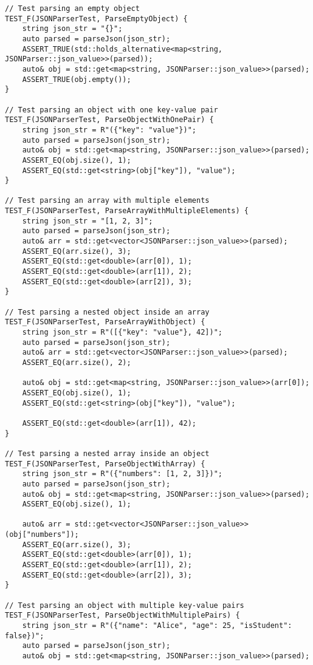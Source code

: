 \begin{verbatim}
// Test parsing an empty object
TEST_F(JSONParserTest, ParseEmptyObject) {
    string json_str = "{}";
    auto parsed = parseJson(json_str);
    ASSERT_TRUE(std::holds_alternative<map<string, JSONParser::json_value>>(parsed));
    auto& obj = std::get<map<string, JSONParser::json_value>>(parsed);
    ASSERT_TRUE(obj.empty());
}

// Test parsing an object with one key-value pair
TEST_F(JSONParserTest, ParseObjectWithOnePair) {
    string json_str = R"({"key": "value"})";
    auto parsed = parseJson(json_str);
    auto& obj = std::get<map<string, JSONParser::json_value>>(parsed);
    ASSERT_EQ(obj.size(), 1);
    ASSERT_EQ(std::get<string>(obj["key"]), "value");
}

// Test parsing an array with multiple elements
TEST_F(JSONParserTest, ParseArrayWithMultipleElements) {
    string json_str = "[1, 2, 3]";
    auto parsed = parseJson(json_str);
    auto& arr = std::get<vector<JSONParser::json_value>>(parsed);
    ASSERT_EQ(arr.size(), 3);
    ASSERT_EQ(std::get<double>(arr[0]), 1);
    ASSERT_EQ(std::get<double>(arr[1]), 2);
    ASSERT_EQ(std::get<double>(arr[2]), 3);
}

// Test parsing a nested object inside an array
TEST_F(JSONParserTest, ParseArrayWithObject) {
    string json_str = R"([{"key": "value"}, 42])";
    auto parsed = parseJson(json_str);
    auto& arr = std::get<vector<JSONParser::json_value>>(parsed);
    ASSERT_EQ(arr.size(), 2);

    auto& obj = std::get<map<string, JSONParser::json_value>>(arr[0]);
    ASSERT_EQ(obj.size(), 1);
    ASSERT_EQ(std::get<string>(obj["key"]), "value");

    ASSERT_EQ(std::get<double>(arr[1]), 42);
}

// Test parsing a nested array inside an object
TEST_F(JSONParserTest, ParseObjectWithArray) {
    string json_str = R"({"numbers": [1, 2, 3]})";
    auto parsed = parseJson(json_str);
    auto& obj = std::get<map<string, JSONParser::json_value>>(parsed);
    ASSERT_EQ(obj.size(), 1);

    auto& arr = std::get<vector<JSONParser::json_value>>(obj["numbers"]);
    ASSERT_EQ(arr.size(), 3);
    ASSERT_EQ(std::get<double>(arr[0]), 1);
    ASSERT_EQ(std::get<double>(arr[1]), 2);
    ASSERT_EQ(std::get<double>(arr[2]), 3);
}

// Test parsing an object with multiple key-value pairs
TEST_F(JSONParserTest, ParseObjectWithMultiplePairs) {
    string json_str = R"({"name": "Alice", "age": 25, "isStudent": false})";
    auto parsed = parseJson(json_str);
    auto& obj = std::get<map<string, JSONParser::json_value>>(parsed);
    

\end{verbatim}
